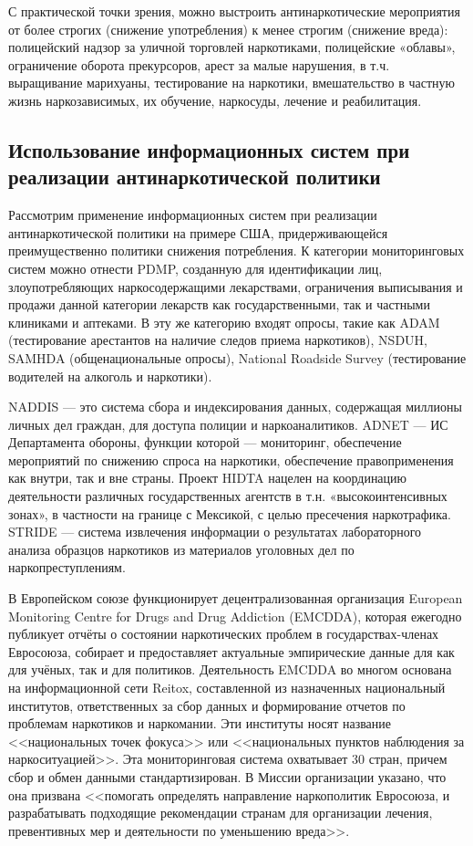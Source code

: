 \documentclass[a4paper,14pt]{article}
\begin{document}
С практической точки зрения, можно выстроить антинаркотические мероприятия от 
более строгих (снижение употребления) к менее строгим (снижение вреда): 
полицейский надзор за уличной торговлей наркотиками, полицейские «облавы», 
ограничение оборота прекурсоров, арест за малые нарушения, в т.ч. выращивание 
марихуаны, тестирование на наркотики, вмешательство в частную жизнь 
наркозависимых, их обучение, наркосуды, лечение и реабилитация.

\subsection{Использование информационных систем при реализации антинаркотической 
    политики}

Рассмотрим применение информационных систем при реализации антинаркотической 
политики на примере США, придерживающейся преимущественно политики снижения 
потребления. К категории мониторинговых систем можно отнести PDMP, созданную для 
идентификации лиц, злоупотребляющих наркосодержащими лекарствами, ограничения 
выписывания и продажи данной категории лекарств как государственными, так и 
частными клиниками и аптеками. В эту же категорию входят опросы, такие как ADAM 
(тестирование арестантов на наличие следов приема наркотиков), NSDUH, SAMHDA 
(общенациональные опросы),  National Roadside Survey (тестирование водителей на 
алкоголь и наркотики). 

NADDIS — это система сбора и индексирования данных, содержащая миллионы личных 
дел граждан, для доступа полиции и наркоаналитиков. ADNET — ИС Департамента 
обороны, функции которой — мониторинг, обеспечение мероприятий по снижению 
спроса на наркотики, обеспечение правоприменения как внутри, так и вне страны. 
Проект HIDTA нацелен на координацию деятельности различных государственных 
агентств в т.н. «высокоинтенсивных зонах», в частности на границе с Мексикой, с 
целью пресечения наркотрафика. STRIDE — система извлечения информации о
результатах лабораторного анализа образцов наркотиков из материалов уголовных 
дел по наркопреступлениям.

В Европейском союзе функционирует децентрализованная организация European 
Monitoring Centre for Drugs and Drug Addiction (EMCDDA), которая ежегодно 
публикует отчёты о состоянии наркотических проблем в государствах-членах 
Евросоюза, собирает и предоставляет актуальные эмпирические данные для как для 
учёных, так и для политиков. Деятельность EMCDDA во многом основана на 
информационной сети Reitox, составленной из назначенных национальный институтов, 
ответственных за сбор данных и формирование отчетов по проблемам наркотиков и 
наркомании.  Эти институты носят название <<национальных точек фокуса>> или 
<<национальных пунктов наблюдения за наркоситуацией>>. Эта мониторинговая 
система охватывает 30 стран, причем сбор и обмен данными стандартизирован. В 
Миссии организации указано, что она призвана <<помогать определять направление 
наркополитик Евросоюза, и разрабатывать подходящие рекомендации странам для 
организации лечения, превентивных мер и деятельности по уменьшению вреда>>.
\end{document}
